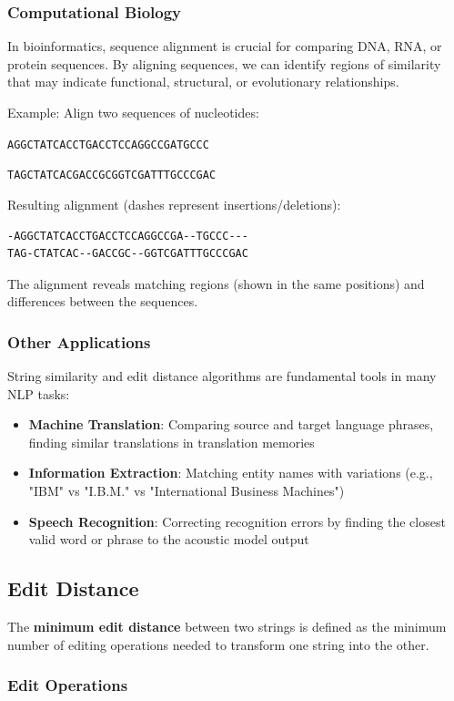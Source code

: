 \documentclass[11pt,a4paper]{article}
\theoremstyle{definition}
\theoremstyle{plain}
\theoremstyle{remark}
\begin{document}
\subsubsection{Computational Biology}
In bioinformatics, sequence alignment is crucial for comparing DNA, RNA, or protein sequences. By aligning sequences, we can identify regions of similarity that may indicate functional, structural, or evolutionary relationships.

Example: Align two sequences of nucleotides:

\texttt{AGGCTATCACCTGACCTCCAGGCCGATGCCC}

\texttt{TAGCTATCACGACCGCGGTCGATTTGCCCGAC}

Resulting alignment (dashes represent insertions/deletions):
\begin{verbatim}
-AGGCTATCACCTGACCTCCAGGCCGA--TGCCC---
TAG-CTATCAC--GACCGC--GGTCGATTTGCCCGAC
\end{verbatim}

The alignment reveals matching regions (shown in the same positions) and differences between the sequences.

\subsubsection{Other Applications}
String similarity and edit distance algorithms are fundamental tools in many NLP tasks:
\begin{itemize}
    \item \textbf{Machine Translation}: Comparing source and target language phrases, finding similar translations in translation memories
    \item \textbf{Information Extraction}: Matching entity names with variations (e.g., "IBM" vs "I.B.M." vs "International Business Machines")
    \item \textbf{Speech Recognition}: Correcting recognition errors by finding the closest valid word or phrase to the acoustic model output
\end{itemize}

\subsection{Edit Distance}

The \textbf{minimum edit distance} between two strings is defined as the minimum number of editing operations needed to transform one string into the other.

\subsubsection{Edit Operations}
\end{document}
